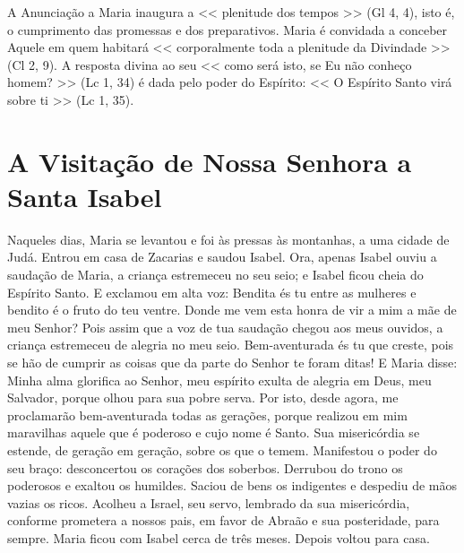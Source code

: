 \documentclass{rosario}
\begin{document}


A Anunciação a Maria inaugura a << plenitude dos tempos >> (Gl 4, 4), isto é, o cumprimento das promessas e dos preparativos.
Maria é convidada a conceber Aquele em quem habitará << corporalmente toda a plenitude da Divindade >> (Cl 2, 9).
A resposta divina ao seu << como será isto, se Eu não conheço homem? >> (Lc 1, 34) é dada pelo poder do Espírito:
<< O Espírito Santo virá sobre ti >> (Lc 1, 35).


\section{A Visitação de Nossa Senhora a Santa Isabel}




Naqueles dias, Maria se levantou e foi às pressas às montanhas, a uma cidade de Judá.
Entrou em casa de Zacarias e saudou Isabel.
Ora, apenas Isabel ouviu a saudação de Maria, a criança estremeceu no seu seio;
e Isabel ficou cheia do Espírito Santo.
E exclamou em alta voz:
Bendita és tu entre as mulheres e bendito é o fruto do teu ventre.
Donde me vem esta honra de vir a mim a mãe de meu Senhor?
Pois assim que a voz de tua saudação chegou aos meus ouvidos, a criança estremeceu de alegria no meu seio.
Bem-aventurada és tu que creste, pois se hão de cumprir as coisas que da parte do Senhor te foram ditas!
E Maria disse:
Minha alma glorifica ao Senhor,
meu espírito exulta de alegria em Deus, meu Salvador,
porque olhou para sua pobre serva.
Por isto, desde agora, me proclamarão bem-aventurada todas as gerações,
porque realizou em mim maravilhas aquele que é poderoso e cujo nome é Santo.
Sua misericórdia se estende, de geração em geração, sobre os que o temem.
Manifestou o poder do seu braço:
desconcertou os corações dos soberbos.
Derrubou do trono os poderosos e exaltou os humildes.
Saciou de bens os indigentes e despediu de mãos vazias os ricos.
Acolheu a Israel, seu servo, lembrado da sua misericórdia,
conforme prometera a nossos pais, em favor de Abraão e sua posteridade, para sempre.
Maria ficou com Isabel cerca de três meses.
Depois voltou para casa.

\end{document}
